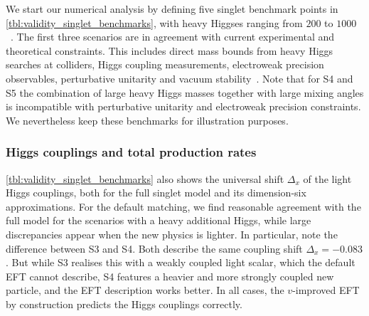 We start our numerical analysis by defining five singlet benchmark
points in \autoref{tbl:validity_singlet_benchmarks}, with heavy Higgses
ranging from $200$ to $1000$~\gev. The first three scenarios are in
agreement with current experimental and theoretical constraints.  This
includes direct mass bounds from heavy Higgs searches at colliders,
Higgs coupling measurements, electroweak precision observables,
perturbative unitarity and vacuum stability~\cite{Pruna:2013bma,
  Lopez-Val:2014jva, Robens:2015gla}. Note that for S4 and S5 the
combination of large heavy Higgs masses together with large mixing
angles is incompatible with perturbative unitarity and electroweak
precision constraints.  We nevertheless keep these benchmarks for
illustration purposes.



\subsubsection{Higgs couplings and total production rates}

\autoref{tbl:validity_singlet_benchmarks} also shows the universal
shift $\Delta_x$ of the light Higgs couplings, both for the full
singlet model and its dimension-six approximations. For the default
matching, we find reasonable agreement with the full model for the
scenarios with a heavy additional Higgs, while large discrepancies
appear when the new physics is lighter. In particular, note the
difference between S3 and S4. Both describe the same coupling shift
$\Delta_x = - 0.083$. But while S3 realises this with a weakly coupled
light scalar, which the default EFT cannot describe, S4 features a
heavier and more strongly coupled new particle, and the EFT
description works better.  In all cases, the $v$-improved EFT by
construction predicts the Higgs couplings correctly.

